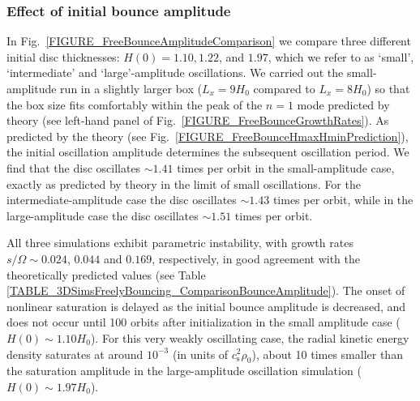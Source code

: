 \documentclass[fleqn,usenatbib]{mnras}
\begin{document}
\subsubsection{Effect of initial bounce amplitude}
In Fig.~\ref{FIGURE_FreeBounceAmplitudeComparison} we compare %
three different initial disc thicknesses: $H(0) = 1.10, 1.22$, and $1.97$, which we refer to as `small', %
`intermediate' %
and `large'-amplitude oscillations. We carried out the small-amplitude run in a slightly larger box ($L_x = 9H_0$ compared to $L_x=8H_0$) so that the box size fits comfortably within the peak of the $n=1$ mode predicted by theory (see left-hand panel of Fig.~\ref{FIGURE_FreeBounceGrowthRates}). As predicted by the theory (see Fig.~\ref{FIGURE_FreeBounceHmaxHminPrediction}), the initial oscillation amplitude determines the subsequent oscillation period. We find that the disc oscillates $\sim 1.41$ times per orbit in the small-amplitude case, exactly as predicted by theory in the limit of small oscillations. For the intermediate-amplitude case the disc oscillates $\sim 1.43$ times per orbit, while in the large-amplitude case the disc oscillates $\sim 1.51$ times per orbit.

All three simulations exhibit parametric instability, with growth rates $s/\Omega \sim 0.024$, $0.044$ and $0.169$, respectively, in good agreement with the theoretically predicted values (see Table \ref{TABLE_3DSimsFreelyBouncing_ComparisonBounceAmplitude}). The onset of nonlinear saturation is delayed as the initial bounce amplitude is decreased, and does not occur until 100 orbits after initialization in the small amplitude case ($H(0) \sim 1.10H_0$). For this very weakly oscillating case, the radial kinetic energy density saturates at around  $10^{-3}$ (in units of $c_\text{s}^2 \rho_0$), about 10 times smaller than the saturation amplitude in the large-amplitude oscillation simulation ($H(0) \sim 1.97H_0$).
\end{document}
